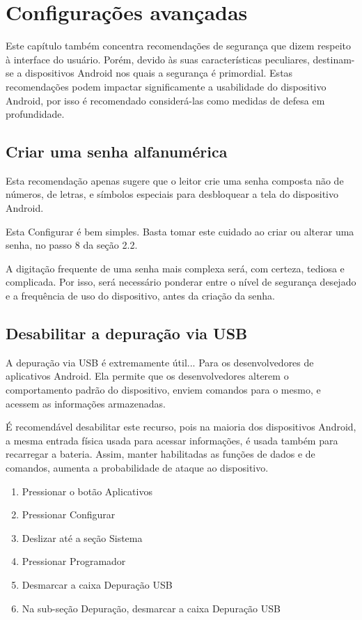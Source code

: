 \chapter{Configura\c c\~oes avan\c cadas}

Este cap\'itulo tamb\'em concentra recomenda\c c\~oes de seguran\c ca que dizem respeito \`a interface do usu\'ario. Por\'em, devido \`as suas caracter\'isticas peculiares, destinam-se a dispositivos Android nos quais a seguran\c ca \'e primordial. Estas recomenda\c c\~oes podem impactar significamente a usabilidade do dispositivo Android, por isso \'e recomendado consider\'a-las como medidas de defesa em profundidade.

\section{Criar uma senha alfanum\'erica}

Esta recomenda\c c\~ao apenas sugere que o leitor crie uma senha composta n\~ao de n\'umeros, de letras, e s\'imbolos especiais para desbloquear a tela do dispositivo Android.

Esta Configurar \'e bem simples. Basta tomar este cuidado ao criar ou alterar uma senha, no passo 8 da se\c c\~ao 2.2.

A digita\c c\~ao frequente de uma senha mais complexa ser\'a, com certeza, tediosa e complicada. Por isso, ser\'a necess\'ario ponderar entre o n\'ivel de seguran\c ca desejado e a frequ\^encia de uso do dispositivo, antes da cria\c c\~ao da senha.

\section{Desabilitar a depura\c c\~ao via USB}

A depura\c c\~ao via USB \'e extremamente \'util... Para os desenvolvedores de aplicativos Android. Ela permite que os desenvolvedores alterem o comportamento padr\~ao do dispositivo, enviem comandos para o mesmo, e acessem as informa\c c\~oes armazenadas. 

\'E recomend\'avel desabilitar este recurso, pois na maioria dos dispositivos Android, a mesma entrada f\'isica usada para acessar informa\c c\~oes, \'e usada tamb\'em para recarregar a bateria. Assim, manter habilitadas as fun\c c\~oes de dados e de comandos, aumenta a probabilidade de ataque ao dispositivo.

\begin{enumerate}
\item Pressionar o bot\~ao Aplicativos
\item Pressionar Configurar
\item Deslizar at\'e a se\c c\~ao Sistema
\item Pressionar Programador
\item Desmarcar a caixa Depura\c c\~ao USB
\item Na sub-se\c c\~ao Depura\c c\~ao, desmarcar a caixa Depura\c c\~ao USB
\end{enumerate}

